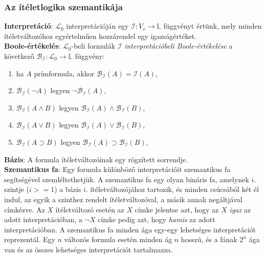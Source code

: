\documentclass[margin=0px]{article}
\begin{document}
	\subsubsection{Az ítéletlogika szemantikája}
	
	\noindent \textbf{Interpretáció}: $\mathcal{L}_{0}$ interpretációján egy $\mathcal{I} : V_{v} \to \mathbb{L}$ függvényt értünk, mely minden ítéletváltozóhoz egyértelműen hozzárendel egy igazságértéket.\\
	
	\noindent \textbf{Boole-értékelés}: $\mathcal{L}_{0}$-beli formulák $\mathcal{I}$ \textit{interpretációbeli Boole-értékelése} a következő $\mathcal{B}_{\mathcal{I}} : \mathcal{L}_{0} \to \mathbb{L}$ függvény:
	
	\begin{enumerate}
		\item ha $A$ prímformula, akkor $\mathcal{B}_{\mathcal{I}}(A) = \mathcal{I}(A)$,
		
		\item $\mathcal{B}_{\mathcal{I}}(\neg A)$ legyen $\neg \mathcal{B}_{\mathcal{I}}(A) $,
		
		\item $\mathcal{B}_{\mathcal{I}}(A \wedge B)$ legyen $\mathcal{B}_{\mathcal{I}}(A) \wedge \mathcal{B}_{\mathcal{I}}(B)$,
		
		\item $\mathcal{B}_{\mathcal{I}}(A \vee B)$ legyen $\mathcal{B}_{\mathcal{I}}(A) \vee \mathcal{B}_{\mathcal{I}}(B)$,
		
		\item $\mathcal{B}_{\mathcal{I}}(A \supset B)$ legyen $\mathcal{B}_{\mathcal{I}}(A) \supset \mathcal{B}_{\mathcal{I}}(B)$,
	\end{enumerate}
	
	\noindent \textbf{Bázis}: A formula ítéletváltozóinak egy rögzített sorrendje.\\
	
	\noindent \textbf{Szemantikus fa}: Egy formula különböző interpretációit szemantikus fa segítségével szemléltethetjük. A szemantikus
	fa egy olyan bináris fa, amelynek $i$. szintje ($i>=1$) a bázis $i$. ítéletváltozójához tartozik, és minden csúcsából két él indul, az
	egyik a szinthez rendelt ítéletváltozóval, a másik annak negáltjával címkézve. Az $X$ ítéletváltozó esetén az $X$ címke jelentse azt, hogy az $X$ \textit{igaz} az adott interpretációban, a $\neg X$ címke pedig azt, hogy \textit{hamis} az adott interpretációban. A szemantikus fa
	minden ága egy-egy lehetséges interpretációt reprezentál. Egy $n$ változós formula esetén minden ág $n$ hosszú, és a fának $2^{n}$ ága van és az összes lehetséges interpretációt tartalmazza. 
	
\end{document}
